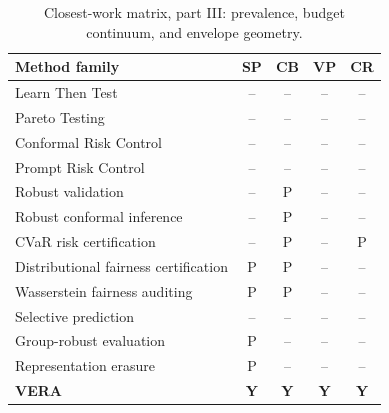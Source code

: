 \begin{table}[t]
\centering\scriptsize
\begin{tabular}{@{}lcccc@{}}
\toprule
Method family & SP & CB & VP & CR \\
\midrule
Learn Then Test \cite{angelopoulos2025ltt} & -- & -- & -- & -- \\
Pareto Testing \cite{laufer2023pareto} & -- & -- & -- & -- \\
Conformal Risk Control \cite{angelopoulos2024crc} & -- & -- & -- & -- \\
Prompt Risk Control \cite{zollo2024prompt} & -- & -- & -- & -- \\
Robust validation \cite{cauchois2024robust} & -- & P & -- & -- \\
Robust conformal inference \cite{ai2024finegrained} & -- & P & -- & -- \\
CVaR risk certification \cite{thomas2019cvar} & -- & P & -- & P \\
Distributional fairness certification \cite{kang2022certifying} & P & P & -- & -- \\
Wasserstein fairness auditing \cite{ehyaei2025fragile} & P & P & -- & -- \\
Selective prediction \cite{elyaniv2010foundations,geifman2019selectivenet} & -- & -- & -- & -- \\
Group-robust evaluation \cite{sagawa2020groupdro,koh2021wilds} & P & -- & -- & -- \\
Representation erasure \cite{ravfogel2020null,ravfogel2022linear,belrose2023leace} & P & -- & -- & -- \\
\textbf{VERA} & \textbf{Y} & \textbf{Y} & \textbf{Y} & \textbf{Y} \\
\bottomrule
\end{tabular}
\caption{Closest-work matrix, part III: prevalence, budget continuum, and envelope geometry.}
\label{tab:novelty-c}
\end{table}

